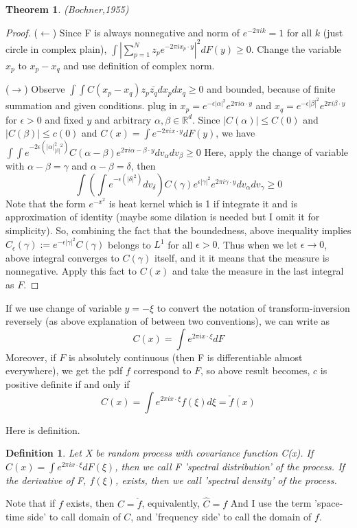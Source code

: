 \documentclass{article}
\newtheorem*{theorem}{Theorem}
\newtheorem*{definition}{Definition}
\begin{document}
{\begin{theorem}{(Bochner,1955)}
\end{theorem}
\begin{proof}
    ($\leftarrow$) Since F is always nonnegative and norm of $e^{-2\pi ik}=1$ for all $k$ (just circle in complex plain), 
    \(\int{|\sum_{p=1}^{N} z_p e^{-2\pi i x_p \cdot y} |^2 dF(y)} \geq 0 \). Change the variable $x_p$ to $x_p-x_q$ and use definition of complex norm.
    
    ($\rightarrow$) Observe \(\int\int C(x_p-x_q) z_p \bar{z_q} dx_p dx_q \geq 0\) and bounded, because of finite summation and given conditions.
    plug in $x_p = e^{-\epsilon|\alpha|^2}e^{2\pi i \alpha \cdot y}$ and $x_q = e^{-\epsilon|\beta|^2}e^{2\pi i \beta \cdot y}$ for $\epsilon>0$ and fixed $y$ and
    arbitrary $\alpha, \beta \in \mathbb R^d$. Since $|C(\alpha)| \leq C(0)$ and $|C(\beta)| \leq c(0)$ and \(C(x)=\int e^{-2\pi i x \cdot y}dF(y)\),
    we have \(\int\int e^{-2\epsilon(|\alpha|^2_|\beta|^2)} C(\alpha-\beta) e^{2\pi i \alpha-\beta \cdot y} dv_\alpha dv_\beta \geq 0\)
    Here, apply the change of variable with $\alpha-\beta=\gamma$ and $\alpha-\beta=\delta$, then
    \[\int(\int e^{-\epsilon(|\delta|^2)} dv_\delta) C(\gamma) e^{\epsilon|\gamma|^2} e^{2\pi i \gamma \cdot y} dv_\alpha dv_\gamma \geq 0\]
    Note that the form $e^{-x^2}$ is heat kernel which is 1 if integrate it and is approximation of identity (maybe some dilation is needed but I omit it for simplicity).
    So, combining the fact that the boundedness, above inequality implies $C_\epsilon(\gamma):=e^{-\epsilon |\gamma|^2}C(\gamma)$ belongs to $L^1$ for all $\epsilon>0$.
    Thus when we let $\epsilon \rightarrow 0$, above integral converges to $C(\gamma)$ itself, and it it means that the measure is nonnegative.
    Apply this fact to $C(x)$ and take the measure in the last integral as $F$.
\end{proof}

If we use change of variable $y=-\xi$ to convert the notation of transform-inversion reversely (as above explanation of between two conventions),
we can write as
\[C(x)=\int e^{2\pi i x\cdot \xi} dF\]
Moreover, if $F$ is absolutely continuous (then F is differentiable almost everywhere), we get the pdf $f$ correspond to $F$,
so above result becomes, $c$ is positive definite if and only if
\[C(x) =\int e^{2\pi i x\cdot \xi} f(\xi)d\xi = \check{f}(x)\]

Here is definition.
\begin{definition}
    Let X be random process with covariance function C(x).
    If \(C(x)= \int e^{2\pi i x\cdot \xi} dF(\xi)\), then we call F 'spectral distribution' of the process.
    If the derivative of F, $f(\xi)$, exists, then we call 'spectral density' of the process.
\end{definition}
Note that if $f$ exists, then  $C=\check{f}$, equivalently, $\hat{C}=f$
And I use the term 'space-time side' to call domain of $C$, and 'frequency side' to call the domain of $f$.

}
\end{document}
